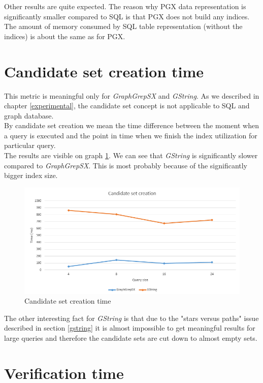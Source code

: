 Other results are quite expected. The reason why PGX data representation is significantly smaller compared to SQL is that PGX does not build any indices. The amount of memory consumed by SQL table representation (without the indices) is about the same as for PGX.

\section{Candidate set creation time}
This metric is meaningful only for \textit{GraphGrepSX} and \textit{GString}. As we described in chapter \ref{experimental}, the candidate set concept is not applicable to SQL and graph database.\\

By candidate set creation we mean the time difference between the moment when a query is executed and the point in time when we finish the index utilization for particular query.\\

The results are visible on graph \ref{fig:candidateset}. We can see that \textit{GString} is significantly slower compared to \textit{GraphGrepSX}. This is most probably because of the significantly bigger index size.\\

\begin{figure}[h]
	\centering
	\includegraphics[width=1\textwidth]{../img/candidateSet.png}
	\caption{Candidate set creation time}
	\label{fig:candidateset}
\end{figure}

The other interesting fact for \textit{GString} is that due to the "stars versus paths" issue described in section \ref{gstring} it is almost impossible to get meaningful results for large queries and therefore the candidate sets are cut down to almost empty sets.

\section{Verification time}

